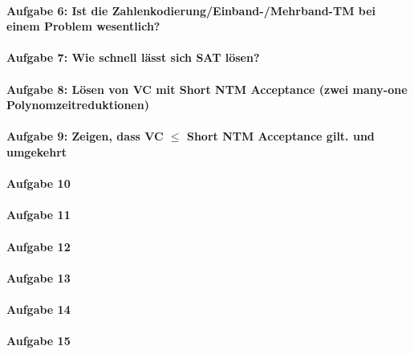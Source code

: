 \documentclass[ngerman]{scrartcl}
\begin{document}
\paragraph{Aufgabe 6: Ist die Zahlenkodierung/Einband-/Mehrband-TM bei einem Problem wesentlich?}
\paragraph{Aufgabe 7: Wie schnell lässt sich SAT lösen? }
\paragraph{Aufgabe 8: Lösen von VC mit Short NTM Acceptance (zwei many-one Polynomzeitreduktionen)} 
\paragraph{Aufgabe 9: Zeigen, dass VC $\leq$ Short NTM Acceptance gilt. und umgekehrt}
\paragraph{Aufgabe 10}
\paragraph{Aufgabe 11}
\paragraph{Aufgabe 12}
\paragraph{Aufgabe 13}
\paragraph{Aufgabe 14}
\paragraph{Aufgabe 15}
\end{document}
